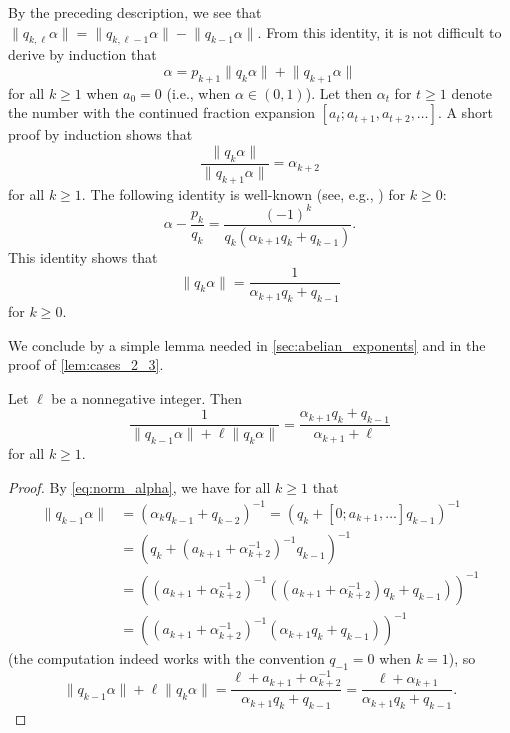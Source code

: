 \documentclass[a4paper,fleqn]{article}
\providecommand{\norm}[1]{\lVert#1\rVert}
\begin{document}
  By the preceding description, we see that
  $\norm{q_{k,\ell}\alpha} = \norm{q_{k,\ell-1}\alpha} - \norm{q_{k-1}\alpha}$. From this identity, it is not
  difficult to derive by induction that
  \begin{equation}\label{eq:cf_identity}
    \alpha = p_{k+1}\norm{q_k\alpha} + \norm{q_{k+1}\alpha}
  \end{equation}
  for all $k \geq 1$ when $a_0 = 0$ (i.e., when $\alpha \in (0, 1)$). Let then $\alpha_t$ for $t \geq 1$ denote the
  number with the continued fraction expansion $[a_t; a_{t+1}, a_{t+2}, \ldots]$. A short proof by induction shows that
  \begin{equation}\label{eq:cf_identity_2}
    \frac{\norm{q_k\alpha}}{\norm{q_{k+1}\alpha}} = \alpha_{k+2}
  \end{equation}
  for all $k \geq 1$. The following identity is well-known (see, e.g., \cite[p.~66]{diss:jarkko_peltomaki}) for
  $k \geq 0$:
  \begin{equation*}
    \alpha - \frac{p_k}{q_k} = \frac{(-1)^k}{q_k(\alpha_{k+1}q_k + q_{k-1})}.
  \end{equation*}
  This identity shows that
  \begin{equation}\label{eq:norm_alpha}
    \norm{q_k\alpha} = \frac{1}{\alpha_{k+1}q_k + q_{k-1}}
  \end{equation}
  for $k \geq 0$.

  We conclude by a simple lemma needed in \autoref{sec:abelian_exponents} and in the proof of \autoref{lem:cases_2_3}.

  \begin{lemma}\label{lem:consecutive_norm}
    Let $\ell$ be a nonnegative integer. Then
    \begin{equation*}
      \frac{1}{\norm{q_{k-1}\alpha} + \ell\norm{q_k \alpha}} = \frac{\alpha_{k+1}q_k + q_{k-1}}{\alpha_{k+1} + \ell}
    \end{equation*}
    for all $k \geq 1$.
  \end{lemma}
  \begin{proof}
    By \eqref{eq:norm_alpha}, we have for all $k \geq 1$ that
    \begin{align*}
      \norm{q_{k-1}\alpha} &= (\alpha_k q_{k-1} + q_{k-2})^{-1} = (q_k + [0; a_{k+1}, \ldots]q_{k-1})^{-1} \\
                           &= (q_k + (a_{k+1} + \alpha_{k+2}^{-1})^{-1}q_{k-1})^{-1} \\
                           &= ( (a_{k+1} + \alpha_{k+2}^{-1})^{-1}( (a_{k+1} + \alpha_{k+2}^{-1})q_k + q_{k-1}) )^{-1} \\
                           &= ( (a_{k+1} + \alpha_{k+2}^{-1})^{-1}(\alpha_{k+1}q_k + q_{k-1}) )^{-1}
    \end{align*}
    (the computation indeed works with the convention $q_{-1} = 0$ when $k = 1$), so
    \begin{equation*}
      \norm{q_{k-1}\alpha} + \ell \norm{q_k \alpha} = \frac{\ell + a_{k+1} + \alpha_{k+2}^{-1}}{\alpha_{k+1}q_k + q_{k-1}} = \frac{\ell + \alpha_{k+1}}{\alpha_{k+1}q_k + q_{k-1}}.
    \end{equation*}
  \end{proof}
\end{document}
